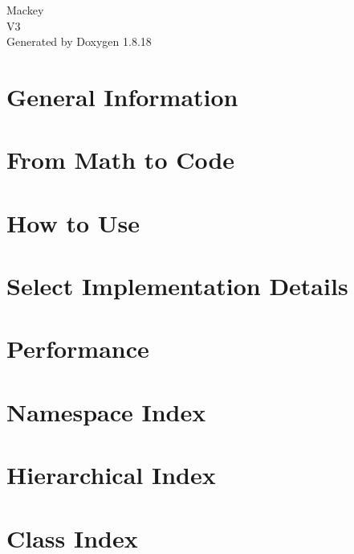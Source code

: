 \let\mypdfximage\pdfximage\def\pdfximage{\immediate\mypdfximage}\documentclass[twoside]{book}
\newcommand{\+}{\discretionary{\mbox{\scriptsize$\hookleftarrow$}}{}{}}
\newcommand{\clearemptydoublepage}{%
  \newpage{\pagestyle{empty}\cleardoublepage}%
}
\begin{document}
\hypersetup{pageanchor=false,
             bookmarksnumbered=true,
             pdfencoding=unicode
            }
\begin{titlepage}
\vspace*{7cm}
\begin{center}%
{\Large Mackey \\[1ex]\large V3 }\\
\vspace*{1cm}
{\large Generated by Doxygen 1.8.18}\\
\end{center}
\end{titlepage}
\clearemptydoublepage
{}
\tableofcontents
\clearemptydoublepage
{}
\hypersetup{pageanchor=true}

\chapter{General Information}
\label{index}\hypertarget{index}{}
\chapter{From Math to Code}
\label{math}

\chapter{How to Use}
\label{use}

\chapter{Select Implementation Details}
\label{algo}

\chapter{Performance}
\label{perf}

\chapter{Namespace Index}

\chapter{Hierarchical Index}

\chapter{Class Index}

\end{document}
